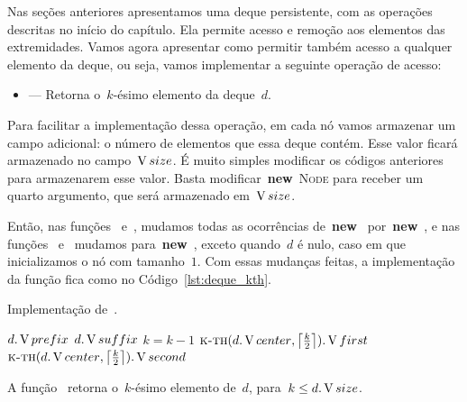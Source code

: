 \documentclass[main.tex]{subfiles}
\begin{document}
Nas seções anteriores apresentamos uma deque persistente, com as operações descritas no início do capítulo. Ela permite acesso e remoção aos elementos das extremidades. Vamos agora apresentar como permitir também acesso a qualquer elemento da deque, ou seja, vamos implementar a seguinte operação de acesso:

\begin{itemize}
    \item {} --- Retorna o~$k$-ésimo elemento da deque~$d$.
\end{itemize}

Para facilitar a implementação dessa operação, em cada nó vamos armazenar um campo adicional: o número de elementos que essa deque contém. Esse valor ficará armazenado no campo~$\operatorname{V}{size}$. É muito simples modificar os códigos anteriores para armazenarem esse valor. Basta modificar~\mbox{\textbf{new} \textsc{Node}} para receber um quarto argumento, que será armazenado em~$\operatorname{V}{size}$.

Então, nas funções~ e~, mudamos todas as ocorrências de~\mbox{\textbf{new} } por~\mbox{\textbf{new} }, e nas funções~ e~ mudamos para~\mbox{\textbf{new} }, exceto quando~$d$ é nulo, caso em que inicializamos o nó com tamanho~$1$.
Com essas mudanças feitas, a implementação da função fica como no Código~\ref{lst:deque_kth}.

\begin{algorithm}
\caption{Implementação de~.} \label{lst:deque_kth}
\begin{algorithmic}[1]

        \State \Return $d.\operatorname{V}{prefix}$\label{line:kth:if1}
    \EndIf
        \State \Return $d.\operatorname{V}{suffix}$ \label{line:kth:if2}
    \EndIf
        \State $k = k - 1$ \label{line:kth:if3}
    \EndIf
        \State \Return $\Call{k-th}{d.\V{center}, \ceil*{\frac{k}{2}}}.\V{first}$
    \Else
        \State \Return $\Call{k-th}{d.\V{center}, \ceil*{\frac{k}{2}}}.\V{second}$
    \EndIf
\EndFunction

\end{algorithmic}
\end{algorithm}


\begin{proposition}
A função~ retorna o~$k$-ésimo elemento de~$d$, para~$k \leq d.\operatorname{V}{size}$.
\end{proposition}
\end{document}
